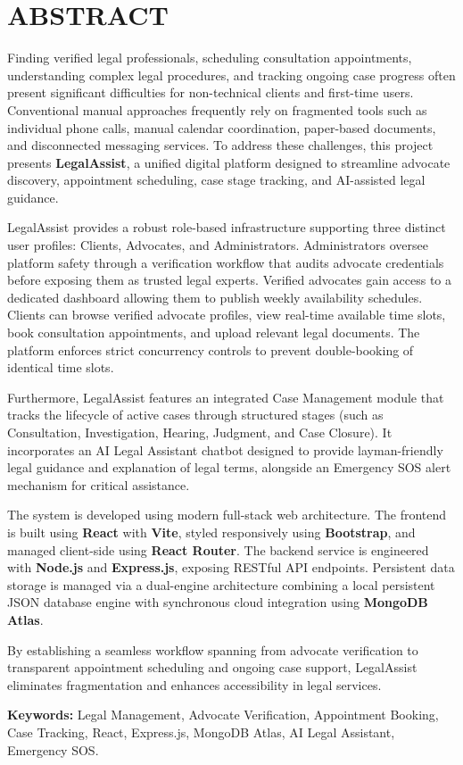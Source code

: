 \chapter*{ABSTRACT}

Finding verified legal professionals, scheduling consultation appointments, understanding complex legal procedures, and tracking ongoing case progress often present significant difficulties for non-technical clients and first-time users. Conventional manual approaches frequently rely on fragmented tools such as individual phone calls, manual calendar coordination, paper-based documents, and disconnected messaging services. To address these challenges, this project presents \textbf{LegalAssist}, a unified digital platform designed to streamline advocate discovery, appointment scheduling, case stage tracking, and AI-assisted legal guidance.

LegalAssist provides a robust role-based infrastructure supporting three distinct user profiles: Clients, Advocates, and Administrators. Administrators oversee platform safety through a verification workflow that audits advocate credentials before exposing them as trusted legal experts. Verified advocates gain access to a dedicated dashboard allowing them to publish weekly availability schedules. Clients can browse verified advocate profiles, view real-time available time slots, book consultation appointments, and upload relevant legal documents. The platform enforces strict concurrency controls to prevent double-booking of identical time slots.

Furthermore, LegalAssist features an integrated Case Management module that tracks the lifecycle of active cases through structured stages (such as Consultation, Investigation, Hearing, Judgment, and Case Closure). It incorporates an AI Legal Assistant chatbot designed to provide layman-friendly legal guidance and explanation of legal terms, alongside an Emergency SOS alert mechanism for critical assistance. 

The system is developed using modern full-stack web architecture. The frontend is built using \textbf{React} with \textbf{Vite}, styled responsively using \textbf{Bootstrap}, and managed client-side using \textbf{React Router}. The backend service is engineered with \textbf{Node.js} and \textbf{Express.js}, exposing RESTful API endpoints. Persistent data storage is managed via a dual-engine architecture combining a local persistent JSON database engine with synchronous cloud integration using \textbf{MongoDB Atlas}. 

By establishing a seamless workflow spanning from advocate verification to transparent appointment scheduling and ongoing case support, LegalAssist eliminates fragmentation and enhances accessibility in legal services.

\vspace{0.8cm}
\noindent \textbf{Keywords:} Legal Management, Advocate Verification, Appointment Booking, Case Tracking, React, Express.js, MongoDB Atlas, AI Legal Assistant, Emergency SOS.

\clearpage
